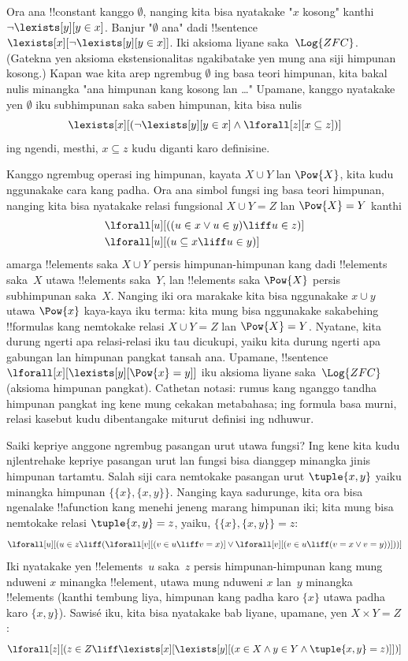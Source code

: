\documentclass[../../../include/open-logic-section]{subfiles}
\begin{document}
Ora ana !!{constant} kanggo $\emptyset$, nanging
kita bisa nyatakake "$x$ kosong" kanthi
$\lnot \lexists[y][y \in x]$. Banjur
"$\emptyset$ ana" dadi !!{sentence}~
$\lexists[x][\lnot \lexists[y][y \in
    x]]$. Iki aksioma liyane saka~$\Log{ZFC}$.
(Gatekna yen aksioma ekstensionalitas ngakibatake
yen mung ana siji himpunan kosong.) Kapan wae
kita arep ngrembug $\emptyset$ ing basa teori
himpunan, kita bakal nulis minangka "ana
himpunan kang kosong lan \dots" Upamane,
kanggo nyatakake yen $\emptyset$ iku
subhimpunan saka saben himpunan, kita bisa nulis
\[
\lexists[x][(\lnot\lexists[y][y \in x] \land \lforall[z][x \subseteq
    z])]
\]
ing ngendi, mesthi, $x \subseteq z$ kudu diganti
karo definisine.

Kanggo ngrembug operasi ing himpunan, kayata
$X \cup Y$ lan $\Pow{X}$, kita kudu nggunakake
cara kang padha. Ora ana simbol fungsi ing basa
teori himpunan, nanging kita bisa nyatakake relasi
fungsional $X \cup Y = Z$ lan $\Pow{X} = Y$ kanthi
\begin{align*}
& \lforall[u][((u \in x \lor u \in y) \liff u \in z)]\\
& \lforall[u][(u \subseteq x \liff u \in y )]
\end{align*}
amarga !!{element}s saka $X \cup Y$ persis
himpunan-himpunan kang dadi !!{element}s saka~$X$
utawa !!{element}s saka~$Y$, lan
!!{element}s saka $\Pow{X}$ persis subhimpunan
saka~$X$. Nanging iki ora marakake kita bisa
nggunakake $x \cup y$ utawa $\Pow{x}$ kaya-kaya
iku terma: kita mung bisa nggunakake sakabehing
!!{formula}s kang nemtokake relasi
$X \cup Y = Z$ lan $\Pow{X} = Y$. Nyatane,
kita durung ngerti apa relasi-relasi iku tau
dicukupi, yaiku kita durung ngerti apa gabungan
lan himpunan pangkat tansah ana. Upamane,
!!{sentence} $\lforall[x][\lexists[y][\Pow{x} = y]]$
iku aksioma liyane saka~$\Log{ZFC}$
(aksioma himpunan pangkat).
Cathetan notasi: rumus kang nganggo tandha himpunan
pangkat ing kene mung cekakan metabahasa; ing formula
basa murni, relasi kasebut kudu dibentangake miturut
definisi ing ndhuwur.

Saiki kepriye anggone ngrembug pasangan urut
utawa fungsi? Ing kene kita kudu njlentrehake
kepriye pasangan urut lan fungsi bisa dianggep
minangka jinis himpunan tartamtu. Salah siji cara
nemtokake pasangan urut $\tuple{x, y}$ yaiku
minangka himpunan $\{\{x\}, \{x, y\}\}$.
Nanging kaya sadurunge, kita ora bisa ngenalake
!!a{function} kang menehi jeneng marang
himpunan iki; kita mung bisa nemtokake relasi
$\tuple{x, y} = z$, yaiku,
$\{\{x\}, \{x, y\}\} = z$:
\[
\lforall[u][(u \in z \liff (\lforall[v][(v \in u \liff v = x)] \lor
  \lforall[v][(v \in u \liff (v = x \lor v = y))]))]
\]
Iki nyatakake yen !!{element}s~$u$ saka~$z$
persis himpunan-himpunan kang mung nduweni $x$
minangka !!{element}, utawa mung nduweni $x$
lan~$y$ minangka !!{element}s (kanthi tembung liya,
himpunan kang padha karo $\{x\}$ utawa
padha karo $\{x, y\}$). Sawisé iku, kita bisa
nyatakake bab liyane, upamane, yen $X \times Y = Z$:
\[
\lforall[z][(z \in Z \liff \lexists[x][\lexists[y][(x \in
        X \land y \in Y \land \tuple{x, y} = z)]])]
\]
\end{document}
